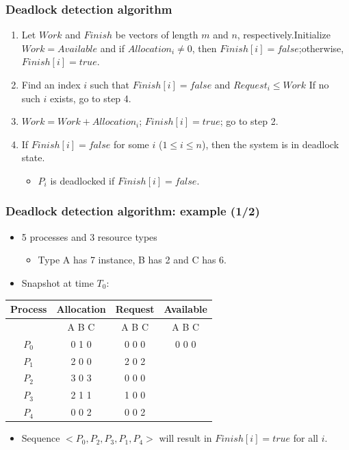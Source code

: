 \documentclass[CJKutf8,xcolor=pdftex,dvipsnames,table]{beamer}
\begin{document}
\begin{CJK*}{UTF8}{song}
  \begin{frame}
  \frametitle{Deadlock detection algorithm} \pause
  \begin{enumerate}
  \item{Let $Work$ and $Finish$ be vectors of length $m$ and $n$, respectively.\newline \pause Initialize $Work = Available$ and if $Allocation_i \neq 0$, then $Finish[i] = false$;otherwise, $Finish[i] = true$.} \pause
  \item{Find an index $i$ such that \newline \pause
      $Finish[i] = false$ and $Request_i \leq Work$ \newline \pause
      If no such $i$ exists, go to step 4. } \pause
  \item{$Work = Work + Allocation_i$; $Finish[i] = true$; \newline go to step 2.} \pause
  \item{If $Finish[i] = false$ for some $i$ ($1 \leq i \leq n$), then the system is in deadlock state.} \pause
    \begin{itemize}
    \item{$P_i$ is deadlocked if $Finish[i] = false$.}
    \end{itemize}
  \end{enumerate}
  \end{frame}
  
  \begin{frame}
  \frametitle{Deadlock detection algorithm: example (1/2)} \pause
  \begin{itemize}
  \item{5 processes and 3 resource types} \pause
    \begin{itemize}
    \item{Type A has 7 instance, B has 2 and C has 6.} \pause
    \end{itemize}
  \item{Snapshot at time $T_0$:} \pause
  \end{itemize}
  \begin{tabular}{cccc}
    Process & Allocation & Request & Available\\
    \hline
            & A B C      & A B C   & A B C\\
    $P_0$   & 0 1 0      & 0 0 0   & 0 0 0\\
    $P_1$   & 2 0 0      & 2 0 2   &      \\
    $P_2$   & 3 0 3      & 0 0 0   &      \\
    $P_3$   & 2 1 1      & 1 0 0   &      \\
    $P_4$   & 0 0 2      & 0 0 2   &      \\
  \end{tabular} \pause
  \begin{itemize}
  \item{Sequence $<P_0, P_2, P_3, P_1, P_4>$ will result in $Finish[i] = true$ for all $i$.}
  \end{itemize}
  \end{frame}
  

\end{CJK*}
\end{document}

